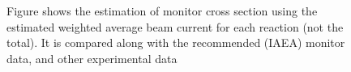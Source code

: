 \documentclass[a4paper,11pt,twoside]{book}
\begin{document}
\begin{figure}
    \quad
    \quad
    \quad
    \quad
    \caption{Figure shows the estimation of monitor cross section using the estimated weighted average beam current for each reaction (not the total). It is compared along with the recommended (IAEA) monitor data, and other experimental data  }%
    \label{fig:monitor_BC+CS}%
\end{figure}
\end{document}
